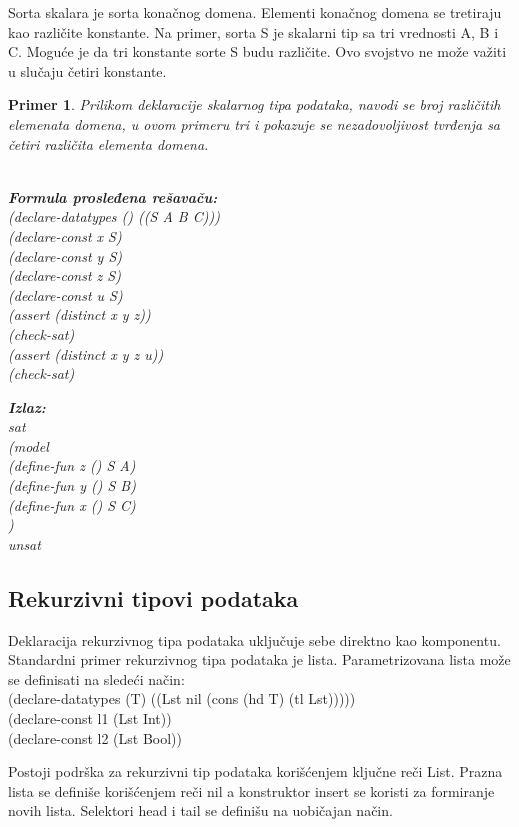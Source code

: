 \documentclass[12pt,oneside]{memoir}
\newcommand\tab[1][0.5cm]{\hspace*{#1}}
\newtheorem{primer}{Primer}
\begin{document}
Sorta skalara je sorta konačnog domena. Elementi konačnog domena se tretiraju kao različite konstante. Na primer, sorta S je skalarni tip sa tri vrednosti A, B i C. Moguće je da tri konstante sorte S budu različite. Ovo svojstvo ne može važiti u slučaju četiri konstante.

\begin{primer} Prilikom deklaracije skalarnog tipa podataka, navodi se broj različitih elemenata domena, u ovom primeru tri i pokazuje se nezadovoljivost tvrđenja sa četiri različita elementa domena. \\ \\
\begin{minipage}[b]{0.5\textwidth}
\textbf{Formula prosleđena rešavaču:}
\\(declare-datatypes () ((S A B C)))
\\(declare-const x S)
\\(declare-const y S)
\\(declare-const z S)
\\(declare-const u S)
\\(assert (distinct x y z))
\\(check-sat)
\\(assert (distinct x y z u))
\\(check-sat)
\end{minipage}
\hspace{2.5cm} 
\begin{minipage}[t]{0.5\textwidth}
\vspace{-6cm}
\textbf{Izlaz:}
\\sat 
\\(model 
\\\tab(define-fun z () S A) 
\\\tab(define-fun y () S B) 
\\\tab(define-fun x () S C)  
\\)
\\unsat
\end{minipage}
\end{primer}

\subsection{Rekurzivni tipovi podataka}

Deklaracija rekurzivnog tipa podataka uključuje sebe direktno kao komponentu. Standardni primer rekurzivnog tipa podataka je lista. Parametrizovana lista može se definisati na sledeći način:\\
(declare-datatypes (T) ((Lst nil (cons (hd T) (tl Lst)))))
\\(declare-const l1 (Lst Int))
\\(declare-const l2 (Lst Bool))
\par
Postoji podrška za rekurzivni tip podataka korišćenjem ključne reči List. 
Prazna lista se definiše korišćenjem reči nil a konstruktor insert se koristi za formiranje novih lista. Selektori head i tail se definišu na uobičajan način.
\end{document}
